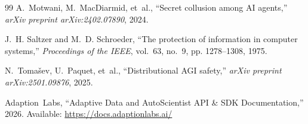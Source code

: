 \documentclass[10pt,twocolumn,a4paper]{article}
\begin{document}
\begin{thebibliography}{99}
A.~Motwani, M.~MacDiarmid, et~al., ``Secret collusion among AI agents,'' \emph{arXiv preprint arXiv:2402.07890}, 2024.

J.~H. Saltzer and M.~D. Schroeder, ``The protection of information in computer systems,'' \emph{Proceedings of the IEEE}, vol.~63, no.~9, pp. 1278--1308, 1975.

N.~Toma{\v{s}}ev, U.~Paquet, et~al., ``Distributional AGI safety,'' \emph{arXiv preprint arXiv:2501.09876}, 2025.

Adaption~Labs, ``Adaptive Data and AutoScientist API \& SDK Documentation,'' 2026. Available: \url{https://docs.adaptionlabs.ai/}

\end{thebibliography}
\end{document}
